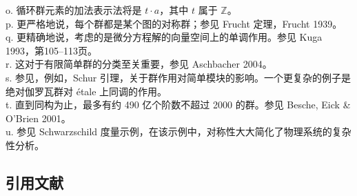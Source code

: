 o. 循环群元素的加法表示法将是 \(t \cdot a\)，其中 \(t\) 属于 \(\mathbb{Z}\)。\\   
p. 更严格地说，每个群都是某个图的对称群；参见 Frucht 定理，Frucht 1939。\\   
q. 更精确地说，考虑的是微分方程解的向量空间上的单调作用。参见 Kuga 1993，第105–113页。\\   
r. 这对于有限简单群的分类至关重要，参见 Aschbacher 2004。\\   
s. 参见，例如，Schur 引理，关于群作用对简单模块的影响。一个更复杂的例子是绝对伽罗瓦群对 étale 上同调的作用。\\   
t. 直到同构为止，最多有约 490 亿个阶数不超过 2000 的群。参见 Besche, Eick & O'Brien 2001。\\   
u. 参见 Schwarzschild 度量示例，在该示例中，对称性大大简化了物理系统的复杂性分析。
\subsection{引用文献}  
